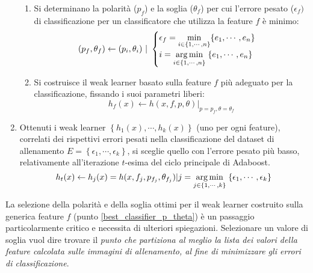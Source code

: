 \begin{enumerate}
\begin{enumerate}
                    \item Si determinano la polarità ($p_f$) e la soglia ($\theta_f$) per cui l'errore pesato ($\epsilon_f)$ di classificazione per un classificatore che utilizza la feature $f$ è minimo:
                    \begin{equation}
                        \label{subeq:minimum_error_polarity_and_threshold}
                        (p_f, \theta_f) \leftarrow (p_i, \theta_i) 
                        \text{ } | \text{ } 
                        \begin{cases}
                            \epsilon_f = \underset{i \in \{1, \cdots, n\}}\min{\left\{ e_1, \cdots, e_n \right\}} & \\
                            i = \underset{i \in \{1, \cdots, n\}}{\operatorname{arg}\operatorname{min}}\;{\left\{ e_1, \cdots, e_n \right\}}
                        \end{cases}
                    \end{equation}

                    \item Si costruisce il weak learner basato sulla feature $f$ più adeguato per la classificazione, fissando i suoi parametri liberi:
                    \begin{equation}
                        \label{subeq:weak_learner_specifications}
                        h_f(x) \leftarrow h(x, f, p, \theta)|_{p = p_f, \theta = \theta_f}
                    \end{equation}
                \end{enumerate}

                \item Ottenuti i weak learner $\left\{h_1(x), \cdots, h_k(x)\right\}$ (uno per ogni feature), correlati dei rispettivi errori pesati nella classificazione del dataset di allenamento $E = \left \{ \epsilon_1, \cdots, \epsilon_k \right \}$, si sceglie quello con l'errore pesato più basso, relativamente all'iterazione $t$-esima del ciclo principale di Adaboost.
                \begin{equation}
                    \label{subeq:best_weak_learner}
                    h_t(x) \leftarrow h_j(x) = h(x, f_j, p_{f_j}, \theta_{f_j})| j = \underset{j \in \{1, \cdots, k\}}{\operatorname{arg}\operatorname{min}}\;{\{\epsilon_1, \cdots, \epsilon_k\}}
                \end{equation}

            \end{enumerate}

            La selezione della polarità e della soglia ottimi per il weak learner costruito sulla generica feature $f$ (punto \ref{best_classifier_p_theta}) è un passaggio particolarmente critico e necessita di ulteriori spiegazioni.
            Selezionare un valore di soglia vuol dire trovare il \emph{punto che partiziona al meglio la lista dei valori della feature calcolata sulle immagini di allenamento, al fine di minimizzare gli errori di classificazione}.
            
